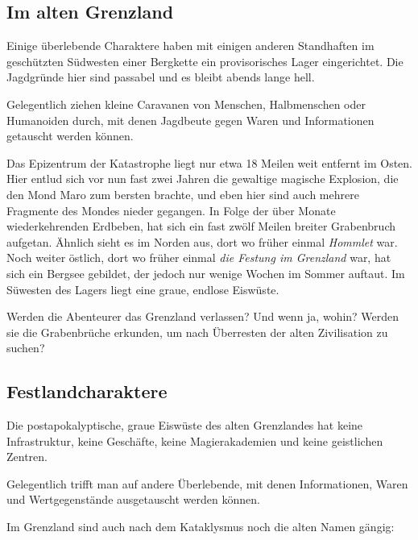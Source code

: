 \documentclass[11pt]{wbzine}
\begin{document}
\begin{multicols}{2}
\section{Im alten Grenzland}

    Einige überlebende Charaktere haben mit
    einigen anderen Standhaften im geschützten Südwesten einer
    Bergkette ein provisorisches Lager eingerichtet. Die Jagdgründe
    hier sind passabel und es bleibt abends lange hell.

    Gelegentlich ziehen kleine Caravanen von Menschen, Halbmenschen
    oder Humanoiden durch, mit denen Jagdbeute gegen Waren und
    Informationen getauscht werden können. 


    Das Epizentrum der Katastrophe liegt nur etwa 18 Meilen weit
    entfernt im Osten. Hier entlud sich vor nun fast zwei Jahren die
    gewaltige magische Explosion, die den Mond Maro zum bersten
    brachte, und eben hier sind auch mehrere Fragmente des Mondes
    nieder gegangen. In Folge der über Monate wiederkehrenden
    Erdbeben, hat sich ein fast zwölf Meilen breiter Grabenbruch
    aufgetan. Ähnlich sieht es im Norden aus, dort wo früher einmal
    \textit{Hommlet} war. Noch weiter östlich, dort wo früher einmal
    \textit{die Festung im Grenzland} war, hat sich ein Bergsee
    gebildet, der jedoch nur wenige Wochen im Sommer auftaut. Im
    Süwesten des Lagers liegt eine graue, endlose Eiswüste.

    Werden die Abenteurer das Grenzland verlassen? Und wenn ja,
    wohin? Werden sie die Grabenbrüche erkunden, um nach Überresten
    der alten Zivilisation zu suchen?

\subsection{Festlandcharaktere}

\begin{tcolorbox}
Die postapokalyptische, graue Eiswüste des alten Grenzlandes hat
keine Infrastruktur, keine Geschäfte, keine Magierakademien und
keine geistlichen Zentren. 
\end{tcolorbox}

Gelegentlich trifft man auf andere
Überlebende, mit denen Informationen, Waren und Wertgegenstände 
ausgetauscht werden können. 

Im Grenzland sind auch nach dem Kataklysmus noch die alten Namen
gängig:


\end{multicols}
\end{document}
